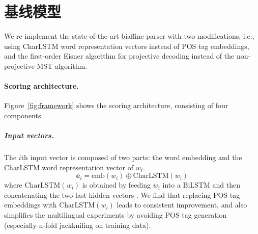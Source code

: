 \section{基线模型}
\label{section:basic_model}


We re-implement the state-of-the-art biaffine parser \cite{Timothy-d17-biaffine} with
two modifications, i.e., using CharLSTM word representation vectors instead of POS tag embeddings, and
the first-order Eisner algorithm \cite{eisner-2000-iwptbook}
for projective decoding instead of the non-projective MST algorithm.

\paragraph{Scoring architecture.}
Figure~\ref{fig:framework} shows the scoring architecture, consisting of four components.





\subparagraph{Input vectors.}
The $i$th input vector %
is composed of two parts:
the word embedding and the CharLSTM word representation vector of $w_i$.
\begin{equation}
    \label{equation:input}
    \mathbf{e}_i=\mathrm{emb}({w_i}) \oplus \mathrm{CharLSTM}(w_i)
\end{equation}
where $\mathrm{CharLSTM}(w_i)$ is obtained by feeding $w_i$ into a BiLSTM and
then concatenating the two last hidden vectors \cite{lample-etal-2016-neural}.
We find that replacing POS tag embeddings with  $\mathrm{CharLSTM}(w_i)$ leads to consistent improvement,
and also simplifies the multilingual experiments by avoiding POS tag generation (especially n-fold jackknifing on training data).

